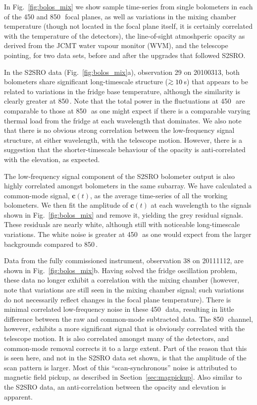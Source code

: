 \documentclass[useAMS,usenatbib,nofootinbib]{mn2e}
\def\gsim{\mathrel{\lower2.5pt\vbox{\lineskip=0pt\baselineskip=0pt
          \hbox{$>$}\hbox{$\sim$}}}}
\begin{document}
In Fig.~\ref{fig:bolos_mix} we show sample time-series from single
bolometers in each of the 450 and 850\,\micron\ focal planes, as well
as variations in the mixing chamber temperature (though not located in
the focal plane itself, it is certainly correlated with the
temperature of the detectors), the line-of-sight atmoshperic opacity
as derived from the JCMT water vapour monitor (WVM), and the telescope
pointing, for two data sets, before and after the upgrades that
followed S2SRO.

In the S2SRO data (Fig.~\ref{fig:bolos_mix}a), observation 29 on
20100313, both bolometers share significant long-timescale structure
($\gsim10$\,s) that appears to be related to variations in the fridge
base temperature, although the similarity is clearly greater at
850\,\micron. Note that the total power in the fluctuations at
450\,\micron\ are comparable to those at 850\,\micron\ as one might
expect if there is a comparable varying thermal load from the fridge
at each wavelength that dominates. We also note that there is no
obvious strong correlation between the low-frequency signal structure,
at either wavelength, with the telescope motion. However, there is a
suggestion that the shorter-timescale behaviour of the opacity is
anti-correlated with the elevation, as expected.

The low-frequency signal component of the S2SRO bolometer output is
also highly correlated amongst bolometers in the same subarray. We
have calculated a common-mode signal, $\mathbf{c}(t)$, as the average
time-series of all the working bolometers. We then fit the amplitude
of $\mathbf{c}(t)$ at each wavelength to the signals shown in
Fig.~\ref{fig:bolos_mix} and remove it, yielding the grey residual
signals. These residuals are nearly white, although still with
noticeable long-timescale variations. The white noise is greater at
450\,\micron\ as one would expect from the larger backgrounds compared
to 850\,\micron.

Data from the fully commissioned instrument, observation 38 on
20111112, are shown in Fig.~\ref{fig:bolos_mix}b. Having solved the
fridge oscillation problem, these data no longer exhibit a correlation
with the mixing chamber (however, note that variations are still seen
in the mixing chamber signal; such variations do not necessarily
reflect changes in the focal plane temperature). There is minimal
correlated low-frequency noise in these 450\,\micron\ data, resulting
in little difference between the raw and common-mode subtracted
data. The 850\,\micron\ channel, however, exhibits a more significant
signal that is obviously correlated with the telescope motion. It is
also correlated amongst many of the detectors, and common-mode removal
corrects it to a large extent. Part of the reason that this is seen
here, and not in the S2SRO data set shown, is that the amplitude of
the scan pattern is larger. Most of this ``scan-synchronous'' noise is
attributed to magnetic field pickup, as described in
Section~\ref{sec:magpickup}. Also similar to the S2SRO data, an
anti-correlation between the opacity and elevation is apparent.
\end{document}
